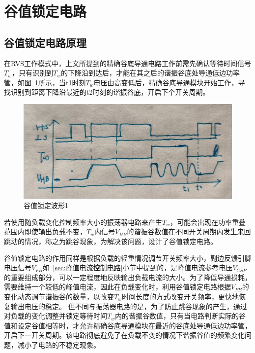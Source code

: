 



\section{谷值锁定电路}

\subsection{谷值锁定电路原理}

在RVS工作模式中，上文所提到的精确谷底导通电路工作前需先确认等待时间信号$T_w$，只有识别到$T_w$的下降沿到达后，才能在其之后的谐振谷底处导通低边功率管，如图~\ref{fig:谷值锁定波形1}所示，当t1时刻$T_w$电压由高变低后，精确谷底导通模块开始工作，寻找识别到距离下降沿最近的t2时刻的谐振谷底，开启下个开关周期。

\begin{figure}[htbp] 
    \centering
    \includegraphics[width=0.6\linewidth]{figures/谷值锁定波形1.jpg}
    \caption{谷值锁定波形1}
    \label{fig:谷值锁定波形1}
\end{figure} 

若使用随负载变化控制频率大小的振荡器电路来产生$T_w$，可能会出现在功率重叠范围内即使输出负载不变，$T_w$内信号$V_{HB}$的谐振谷数值在不同开关周期内发生来回跳动的情况，称之为跳谷现象，为解决该问题，设计了谷值锁定电路。

谷值锁定电路的作用同样是根据负载的轻重情况调节开关频率大小，副边反馈引脚电压信号$V_{FB}$如~\ref{sec:峰值电流控制电路}小节中提到的，是峰值电流参考电压$V_{CSP}$的重要组成部分，可以一定程度地反映输出负载电流的大小。为了降低导通损耗，需要维持一个较低的峰值电流，因此在负载变化时，利用谷值锁定电路根据$V_{FB}$的变化动态调节谐振谷的数量，以改变$T_w$时间长度的方式改变开关频率，更快地恢复输出电压的稳定。
但不同与振荡器电路的是，为了防止跳谷现象的产生，通过对负载的变化调整并锁定等待时间$T_w$内的谐振谷数值，只有当电路判断实际的谷值和设定谷值相等时，才允许精确谷底导通模块在最近的谷底处导通低边功率管，开启下一开关周期。该电路彻底避免了在负载不变的情况下谐振谷值的频繁变化问题，减小了电路的不稳定现象。

